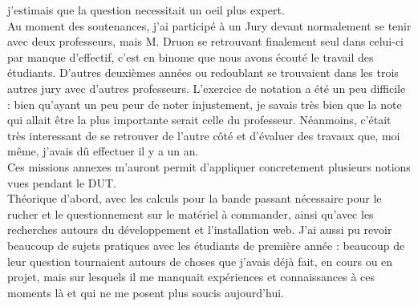 \documentclass[11pt,french,a4paper]{report}
\begin{document}
j'estimais que la question necessitait un oeil plus expert. \\
Au moment des soutenances, j'ai participé à un Jury devant normalement se tenir avec deux professeurs, mais M. Druon se retrouvant 
finalement seul dans celui-ci par manque d'effectif, c'est en binome que nous avons écouté le travail des étudiants.
D'autres deuxièmes années ou redoublant se trouvaient dans les trois autres jury avec d'autres professeurs. 
L'exercice de notation a été un peu difficile : bien qu'ayant un peu peur de noter injustement,
je savais très bien que la note qui allait être la plus importante serait celle 
du professeur. Néanmoins, c'était très interessant de se retrouver de l'autre côté et d'évaluer des travaux que, moi même, 
j'avais dû effectuer il y a un an. \\
Ces missions annexes m'auront permit d'appliquer concretement plusieurs notions vues pendant le DUT. \\
Théorique d'abord, avec les calculs pour la bande passant nécessaire pour le rucher et le questionnement sur le matériel à commander, ainsi
qu'avec les recherches autours du développement et l'installation web. 
J'ai aussi pu revoir beaucoup de sujets pratiques avec les étudiants de première année : beaucoup de leur question tournaient autours 
de choses que j'avais déjà fait, en cours ou en projet,  mais sur lesquels il me manquait expériences et connaissances à ces moments là et
qui ne me posent plus soucis aujourd'hui. \\
\end{document}
